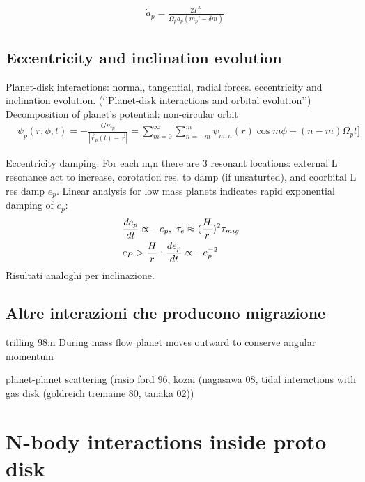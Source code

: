 \begin{align*}
&\dot{a}_p=\frac{2\Gamma^L}{\Omega_pa_p(m_p’-\delta m)}
\end{align*}

\section{Eccentricity and inclination evolution}
Planet-disk interactions: normal, tangential, radial forces. eccentricity and inclination evolution. (‘’Planet-disk interactions and orbital evolution’’)
Decomposition of planet’s potential: non-circular orbit
\begin{align*}
&\psi_p(r,\phi,t)=-\frac{Gm_p}{|\vec{r}_p(t)-\vec{r}|}=\sum_{m=0}^{\infty}\sum_{n=-m}^m\psi_{m,n}(r)\cos{m\phi+(n-m)\Omega_pt]}
\end{align*}

Eccentricity damping.
For each m,n there are 3 resonant locations: external L resonance act to increase, corotation res. to damp (if unsaturted), and coorbital L res damp $e_p$. Linear analysis for low mass planets indicates rapid exponential damping of $e_p$:
\begin{align*}
&\TDy{t}{e_p}\propto-e_p,\ \tau_e\approx(\frac{H}{r})^2\tau_{mig}\\
&e_P>\frac{H}{r}: \TDy{t}{e_p}\propto-e_p\expy{-2}
\end{align*}
Risultati analoghi per inclinazione.	

\section{Altre interazioni che producono migrazione}

\begin{workout}
trilling 98:n During mass flow planet moves outward to conserve angular momentum
\end{workout}

\begin{workout}
planet-planet scattering (rasio ford 96, kozai (nagasawa 08, tidal interactions with gas disk (goldreich tremaine 80, tanaka 02))
\end{workout}


{\let\clearpage\relax\let\cleardoublepage\relax
\chapter{N-body interactions inside proto disk}
}